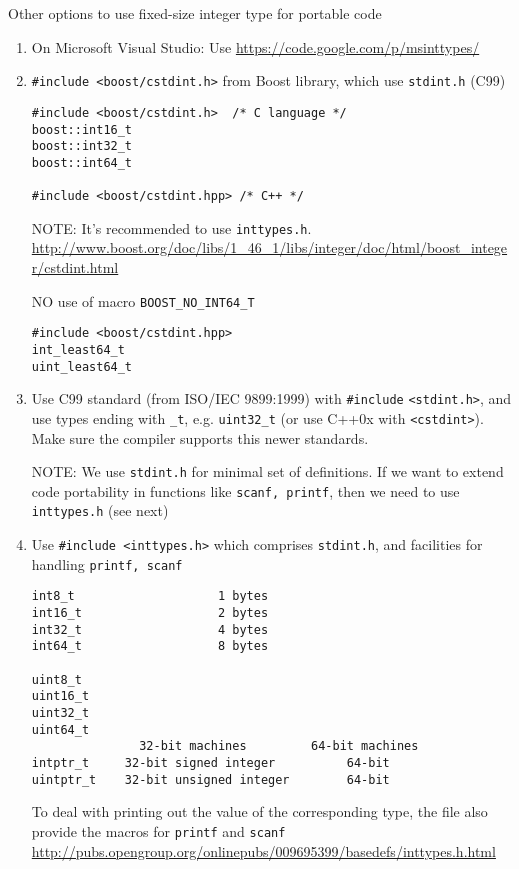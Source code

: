 Other options to use fixed-size integer type for portable code
\begin{enumerate}
  \item On Microsoft Visual Studio: Use
  \url{https://code.google.com/p/msinttypes/}
  
  \item \verb!#include <boost/cstdint.h>! from Boost library, which use
  \verb!stdint.h! (C99)
  
\begin{verbatim}
#include <boost/cstdint.h>  /* C language */
boost::int16_t
boost::int32_t
boost::int64_t

#include <boost/cstdint.hpp> /* C++ */
\end{verbatim}  
NOTE: It's recommended to use \verb!inttypes.h!. 
\url{http://www.boost.org/doc/libs/1_46_1/libs/integer/doc/html/boost_integer/cstdint.html}

NO use of macro \verb!BOOST_NO_INT64_T!
\begin{verbatim}
#include <boost/cstdint.hpp> 
int_least64_t
uint_least64_t
\end{verbatim}

  \item Use C99 standard (from ISO/IEC 9899:1999) with \verb!#include!
  \verb!<stdint.h>!, and use types ending with \verb!_t!, e.g. \verb!uint32_t!
  (or use C++0x with \verb!<cstdint>!).
  Make sure the compiler supports this newer standards.
  
NOTE: We use \verb!stdint.h! for minimal set of definitions. If we want to
extend code portability in functions like \verb!scanf, printf!, then we need to
use \verb!inttypes.h! (see next)
  
  \item Use \verb!#include <inttypes.h>! which
  comprises \verb!stdint.h!, and facilities for handling \verb!printf, scanf!

\begin{verbatim}
int8_t                    1 bytes
int16_t                   2 bytes
int32_t                   4 bytes
int64_t                   8 bytes

uint8_t
uint16_t
uint32_t
uint64_t
               32-bit machines         64-bit machines
intptr_t     32-bit signed integer          64-bit
uintptr_t    32-bit unsigned integer        64-bit
\end{verbatim}
To deal with printing out the value of the corresponding type, the file also
provide the macros for \verb!printf! and \verb!scanf!
\url{http://pubs.opengroup.org/onlinepubs/009695399/basedefs/inttypes.h.html}


\end{enumerate}
